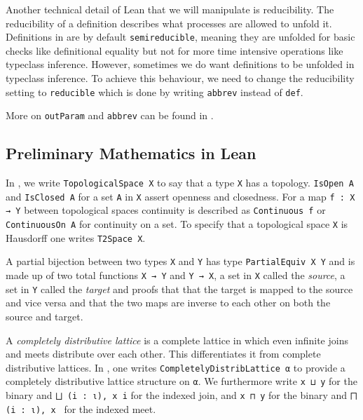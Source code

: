 Another technical detail of Lean that we will manipulate is reducibility.
The reducibility of a definition describes what processes are allowed to unfold it. 
Definitions in \mathlib are by default \lstinline|semireducible|, meaning they are unfolded for basic checks like definitional equality but not for more time intensive operations like typeclass inference.
However, sometimes we do want definitions to be unfolded in typeclass inference. 
To achieve this behaviour, we need to change the reducibility setting to \lstinline|reducible| which is done by writing \lstinline|abbrev| instead of \lstinline|def|. 

More on \lstinline|outParam| and \lstinline|abbrev| can be found in \cite{LeanReference2025}.


\subsection{Preliminary Mathematics in Lean}\label{sub:mathinlean}

In \mathlib, we write \lstinline|TopologicalSpace X| to say that a type \lstinline|X| has a topology. 
\lstinline|IsOpen A| and \lstinline|IsClosed A| for a set \lstinline|A| in \lstinline|X| assert openness and closedness. 
For a map \lstinline|f : X → Y| between topological spaces continuity is described as \lstinline|Continuous f| or \lstinline|ContinuousOn A| for continuity on a set. 
To specify that a topological space \lstinline|X| is Hausdorff one writes \lstinline|T2Space X|.

A partial bijection between two types \lstinline|X| and \lstinline|Y| has type \lstinline|PartialEquiv X Y| and is made up of two total functions \lstinline|X → Y| and \lstinline|Y → X|, a set in \lstinline|X| called the \emph{source}, a set in \lstinline|Y| called the \emph{target} and proofs that that the target is mapped to the source and vice versa and that the two maps are inverse to each other on both the source and target.

A \emph{completely distributive lattice} is a complete lattice in which even infinite joins and meets distribute over each other. 
This differentiates it from complete distributive lattices. 
In \mathlib, one writes \lstinline|CompletelyDistribLattice α| to provide a completely distributive lattice structure on \lstinline|α|. 
We furthermore write \lstinline|x ⊔ y| for the binary and \lstinline|⨆ (i : ι), x i| for the indexed join, and \lstinline|x ⊓ y| for the binary and \lstinline|⨅ (i : ι), x | for the indexed meet.